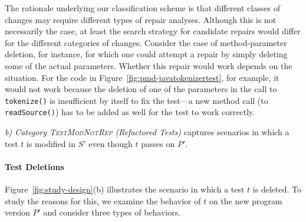 \documentclass[conference]{IEEEtran}
\newcommand{\lang}[1]{\texttt{\small #1}}
\newcommand{\subject}[1]{\texttt{\small #1}}
\newcommand{\catref}{\textsc{TestModNotRep}}
\begin{document}
The rationale underlying our classification scheme is that different
classes of changes may require different types of repair analyses.
Although this is not necessarily the case, at least the search
strategy for candidate repairs would differ for the different
categories of changes. Consider the case of method-parameter deletion,
for instance, for which one could attempt a repair by simply deleting
some of the actual parameters. Whether this repair would work depends
on the situation. For the code in
Figure~\ref{fig:pmd-javatokenizertest}, for example, it would not work
because the deletion of one of the parameters in the call to
\lang{tokenize()} is insufficient by itself to fix the test---a new
method call (to \lang{readSource()}) has to be added as well for the
test to work correctly.

\textit{b) Category \catref{} (Refactored Tests)} captures
scenarios in which a test $t$ is modified in $S'$ even though $t$
passes on $P'$.



\paragraph*{\textbf{Test Deletions}}
\label{sec:test-ref}

Figure~\ref{fig:study-design}(b) illustrates the scenario in which a
test $t$ is deleted. To study the reasons for this, we examine the
behavior of $t$ on the new program version $P'$ and consider three
types of behaviors.
\end{document}

